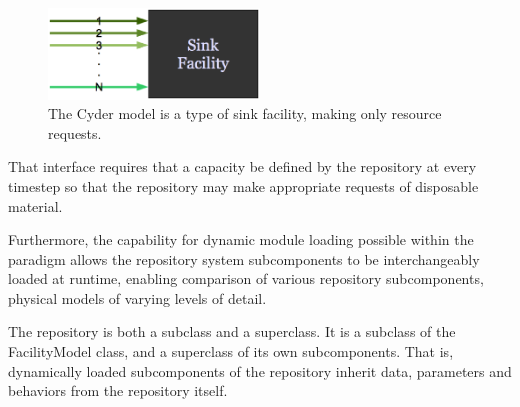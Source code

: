 \begin{figure}[htb!]
  \begin{center}
    \includegraphics[width=0.5\textwidth]{./chapters/paradigm/sinkfacility.eps}
  \end{center}
  \caption{The Cyder model is a type of sink facility, making only resource requests.}
  \label{fig:sinkfacility}
\end{figure}

That interface requires that a capacity be defined by the repository at every 
\Cyclus timestep so that the repository may make appropriate requests of 
disposable material.

Furthermore, the capability for dynamic module loading possible within 
the \Cyclus paradigm allows the repository system subcomponents to be 
interchangeably loaded at runtime, enabling comparison of various 
repository subcomponents, physical models of varying levels of detail. 

The repository is both a subclass and a superclass. It is a subclass of the 
FacilityModel class, and a superclass of its own subcomponents. That is, 
dynamically loaded subcomponents of the repository inherit data, parameters and 
behaviors from the repository itself. 




